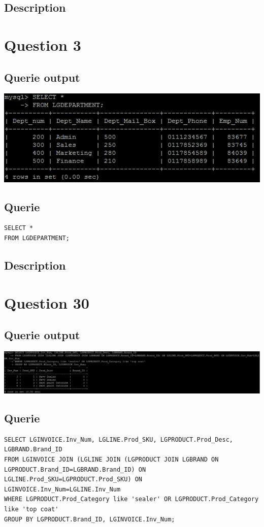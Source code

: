 \documentclass[a4paper,10pt]{article}
\begin{document}
\subsection{Description}\section*{Question 3}
\subsection{Querie output}
           \includegraphics{Queries/Question_3/Q3_screenshot.jpg}
 \subsection{Querie}
          \lstset{
            language=SQL,
            breaklines=true
            }
        \begin{lstlisting}[frame=single]
        SELECT *
FROM LGDEPARTMENT;

        \end{lstlisting}
\subsection{Description}\section*{Question 30}
\subsection{Querie output}
           \includegraphics{Queries/Question_30/Q30_screenshot.jpg}
 \subsection{Querie}
          \lstset{
            language=SQL,
            breaklines=true
            }
        \begin{lstlisting}[frame=single]
        SELECT LGINVOICE.Inv_Num, LGLINE.Prod_SKU, LGPRODUCT.Prod_Desc, LGBRAND.Brand_ID
FROM LGINVOICE JOIN (LGLINE JOIN (LGPRODUCT JOIN LGBRAND ON LGPRODUCT.Brand_ID=LGBRAND.Brand_ID) ON LGLINE.Prod_SKU=LGPRODUCT.Prod_SKU) ON LGINVOICE.Inv_Num=LGLINE.Inv_Num
WHERE LGPRODUCT.Prod_Category like 'sealer' OR LGPRODUCT.Prod_Category like 'top coat'
GROUP BY LGPRODUCT.Brand_ID, LGINVOICE.Inv_Num;
        \end{lstlisting}
\end{document}
